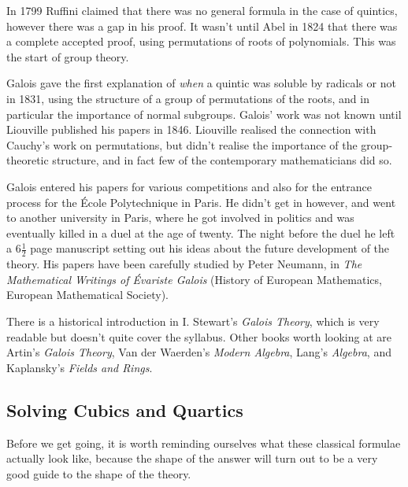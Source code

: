 In 1799 Ruffini claimed that there was no general formula in the case of quintics, however there was a gap in his proof. It wasn't until Abel in 1824 that there was a complete accepted proof, using permutations of roots of polynomials. This was the start of group theory.

Galois gave the first explanation of \emph{when} a quintic was soluble by radicals or not in 1831, using the structure of a group of permutations of the roots, and in particular the importance of normal subgroups. Galois' work was not known until Liouville published his papers in 1846. Liouville realised the connection with Cauchy's work on permutations, but didn't realise the importance of the group-theoretic structure, and in fact few of the contemporary mathematicians did so.

Galois entered his papers for various competitions and also for the entrance process for the \'Ecole Polytechnique in Paris. He didn't get in however, and went to another university in Paris, where he got involved in politics and was eventually killed in a duel at the age of twenty. The night before the duel he left a $6\frac{1}{2}$ page manuscript setting out his ideas about the future development of the theory. His papers have been carefully studied by Peter Neumann, in \emph{The Mathematical Writings of \'Evariste Galois} (History of European Mathematics, European Mathematical Society).

There is a historical introduction in I. Stewart's \emph{Galois Theory}, which is very readable but doesn't quite cover the syllabus. Other books worth looking at are Artin's \emph{Galois Theory}, Van der Waerden's \emph{Modern Algebra}, Lang's \emph{Algebra}, and Kaplansky's \emph{Fields and Rings}.

\subsection{Solving Cubics and Quartics}

Before we get going, it is worth reminding ourselves what these classical formulae actually look like, because the shape of the answer will turn out to be a very good guide to the shape of the theory.

